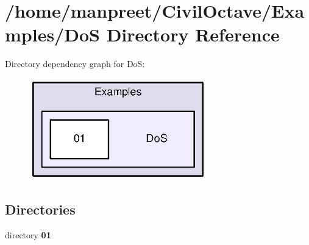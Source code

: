 \section{/home/manpreet/\-Civil\-Octave/\-Examples/\-Do\-S Directory Reference}
\label{dir_4c15a2ab7feb97838ff62e1b483bdced}
Directory dependency graph for Do\-S\-:
\nopagebreak
\begin{figure}[H]
\begin{center}
\leavevmode
\includegraphics[width=218pt]{dir_4c15a2ab7feb97838ff62e1b483bdced_dep}
\end{center}
\end{figure}
\subsection*{Directories}
\begin{DoxyCompactItemize}
\item 
directory {\bf 01}
\end{DoxyCompactItemize}
